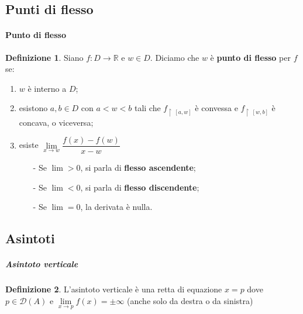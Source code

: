 \documentclass{article}
\theoremstyle{plain}
\theoremstyle{definition}
\newtheorem{defn}{Definizione}[section]
\theoremstyle{remark}
\begin{document}
\vspace{10pt}

\subsection{Punti di flesso}

\vspace{10pt}

\paragraph{Punto di flesso}
\begin{bxthm}
\begin{defn}
    Siano $f:D\to\mathbb{R}$ e $w\in D$. Diciamo che $w$ è \textbf{punto di flesso} per $f$ se:
    \begin{enumerate}
        \item $w$ è interno a $D$;
        \item esistono $a,b\in D$ con $a<w<b$ tali che $f_{\upharpoonright \  [a,w]}$ è convessa e $f_{\upharpoonright \  [w,b]}$ è concava, o viceversa;
        \item esiste $\lim\limits_{x\to w}\dfrac{f(x)-f(w)}{x-w}$
        \begin{itemize}
            \item[-] Se $\lim>0$, si parla di \textbf{flesso ascendente};
            \item[-] Se $\lim<0$, si parla di \textbf{flesso discendente};
            \item[-] Se $\lim=0$, la derivata è nulla.
        \end{itemize}
    \end{enumerate}
\end{defn}
\end{bxthm}

\vspace{10pt}

\subsection{Asintoti}

\vspace{10pt}

\subparagraph{Asintoto verticale}
\begin{bxthm}
\begin{defn}
    L'asintoto verticale è una retta di equazione $x=p$ dove $p\in \mathcal{D}(A)$ e $\lim\limits_{x\to p}f(x)=\pm\infty$ (anche solo da destra o da sinistra)
\end{defn}
\end{bxthm}
\end{document}

